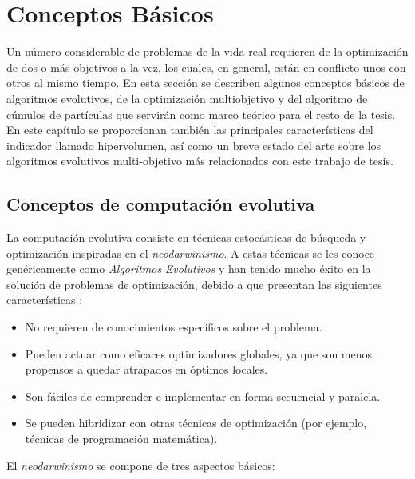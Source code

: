 \chapter{Conceptos B\'asicos}
  Un n\'umero considerable de problemas de la vida real requieren de la optimizaci\'on de dos o m\'as objetivos a la vez, 
  los cuales, en general, est\'an en conflicto unos con otros al mismo tiempo. En esta secci\'on se describen algunos 
  conceptos b\'asicos de algoritmos evolutivos, de la optimizaci\'on multiobjetivo y del algoritmo de c\'umulos de 
  part\'iculas que servir\'an como marco te\'orico para el resto de la tesis. En este cap\'itulo se proporcionan tambi\'en 
  las principales caracter\'isticas del indicador llamado hipervolumen, as\'i como un breve estado 
  del arte sobre los algoritmos evolutivos multi-objetivo m\'as relacionados con este trabajo de tesis.

  \section{Conceptos de computaci\'on evolutiva}
  
  La computaci\'on evolutiva consiste en t\'ecnicas estoc\'asticas de b\'usqueda y optimizaci\'on inspiradas en el 
  \textit{neodarwinismo}. A estas t\'ecnicas se les conoce gen\'ericamente como \textit{Algoritmos} \textit{Evolutivos} 
  y han tenido mucho  \'exito en la soluci\'on de problemas de optimizaci\'on, debido a que presentan las siguientes 
  caracter\'isticas \cite{vicente06}:
  
  \begin{itemize}
  \item No requieren de conocimientos espec\'ificos sobre el problema.
  \item Pueden actuar como eficaces optimizadores globales, ya que son menos propensos a quedar atrapados en 
  \'optimos locales.
  \item Son f\'aciles de comprender e implementar en forma secuencial y paralela.
  \item Se pueden hibridizar con otras t\'ecnicas de optimizaci\'on (por ejemplo, t\'ecnicas de programaci\'on 
  matem\'atica).
  \end{itemize}

  El \textit{neodarwinismo} se compone de tres aspectos b\'asicos:
  
